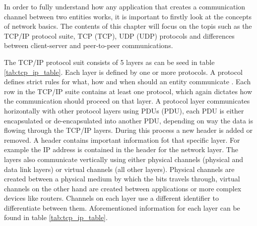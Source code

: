In order to fully understand how any application that creates a communication channel between two entities works, it is important to firstly look at the concepts of network basics. The contents of this chapter will focus on the topis such as the TCP/IP protocol suite, TCP (\acl{TCP}), UDP (\acl{UDP}) protocols and differences between client-server and peer-to-peer communications.

The TCP/IP protocol suit consists of 5 layers as can be seed in table \ref{tab:tcp_ip_table}. Each layer is defined by one or more protocols. A protocol defines strict rules for what, how and when should an entity communicate \cite{Forouzan2010}. Each row in the TCP/IP suite contains at least one protocol, which again dictates how the communication should proceed on that layer. A protocol layer communicates horizontally with other protocol layers using PDUs (\acl{PDU}), each PDU is either encapsulated or de-encapsulated into another PDU, depending on way the data is flowing through the TCP/IP layers. During this process a new header is added or removed. A header contains important information fot that specific layer. For example the IP address is contained in the header for the network layer. The layers also communicate vertically using either physical channels (physical and data link layers) or virtual channels (all other layers). Physical channels are created between a physical medium by which the bits travels through, virtual channels on the other hand are created between applications or more complex devices like routers. Channels on each layer use a different identifier to differentiate between them. Aforementioned information for each layer can be found in table \ref{tab:tcp_ip_table}.

